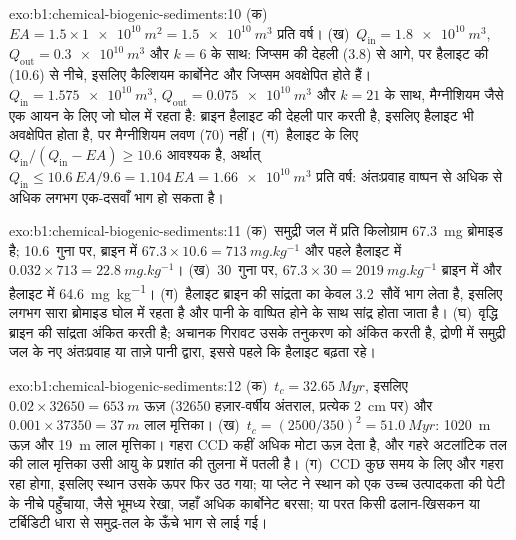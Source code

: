 \begin{solution}{exo:b1:chemical-biogenic-sediments:10}
(क)~$EA = 1.5\times\qty{1e10}{m^2} = \qty{1.5e10}{m^3}$ प्रति वर्ष। (ख)~$Q_{\mathrm{in}} = \qty{1.8e10}{m^3}$, $Q_{\mathrm{out}} = \qty{0.3e10}{m^3}$ और $k = 6$ के साथ: जिप्सम की देहली (3.8) से आगे, पर हैलाइट की (10.6) से नीचे, इसलिए कैल्शियम कार्बोनेट और जिप्सम अवक्षेपित होते हैं। $Q_{\mathrm{in}} =
\qty{1.575e10}{m^3}$, $Q_{\mathrm{out}} = \qty{0.075e10}{m^3}$ और $k = 21$ के साथ, मैग्नीशियम जैसे एक आयन के लिए जो घोल में रहता है: ब्राइन हैलाइट की देहली पार करती है, इसलिए हैलाइट भी अवक्षेपित होता है, पर मैग्नीशियम लवण (70) नहीं। (ग)~हैलाइट के लिए $Q_{\mathrm{in}}/(Q_{\mathrm{in}} - EA) \ge 10.6$ आवश्यक है, अर्थात् $Q_{\mathrm{in}} \le 10.6\,EA/9.6 = 1.104\,EA = \qty{1.66e10}{m^3}$ प्रति वर्ष: अंतःप्रवाह वाष्पन से अधिक से अधिक लगभग एक-दसवाँ भाग हो सकता है।
\end{solution}

\begin{solution}{exo:b1:chemical-biogenic-sediments:11}
(क)~समुद्री जल में प्रति किलोग्राम \qty{67.3}{mg} ब्रोमाइड है; 10.6~गुना पर, ब्राइन में $67.3\times10.6 = \qty{713}{mg.kg^{-1}}$ और पहले हैलाइट में $0.032\times713 = \qty{22.8}{mg.kg^{-1}}$। (ख)~30~गुना पर, $67.3\times30 =
\qty{2019}{mg.kg^{-1}}$ ब्राइन में और हैलाइट में \qty{64.6}{mg.kg^{-1}}। (ग)~हैलाइट ब्राइन की सांद्रता का केवल 3.2~सौवें भाग लेता है, इसलिए लगभग सारा ब्रोमाइड घोल में रहता है और पानी के वाष्पित होने के साथ सांद्र होता जाता है। (घ)~वृद्धि ब्राइन की सांद्रता अंकित करती है; अचानक गिरावट उसके तनुकरण को अंकित करती है, द्रोणी में समुद्री जल के नए अंतःप्रवाह या ताज़े पानी द्वारा, इससे पहले कि हैलाइट बढ़ता रहे।
\end{solution}

\begin{solution}{exo:b1:chemical-biogenic-sediments:12}
(क)~$t_c = \qty{32.65}{Myr}$, इसलिए $0.02\times\num{32650} = \qty{653}{m}$ ऊज़ (\num{32650} हज़ार-वर्षीय अंतराल, प्रत्येक \qty{2}{cm} पर) और $0.001\times\num{37350} = \qty{37}{m}$ लाल मृत्तिका। (ख)~$t_c = (2500/350)^2 =
\qty{51.0}{Myr}$: \qty{1020}{m} ऊज़ और \qty{19}{m} लाल मृत्तिका। गहरा CCD कहीं अधिक मोटा ऊज़ देता है, और गहरे अटलांटिक तल की लाल मृत्तिका उसी आयु के प्रशांत की तुलना में पतली है। (ग)~CCD कुछ समय के लिए और गहरा रहा होगा, इसलिए स्थान उसके ऊपर फिर उठ गया; या प्लेट ने स्थान को एक उच्च उत्पादकता की पेटी के नीचे पहुँचाया, जैसे भूमध्य रेखा, जहाँ अधिक कार्बोनेट बरसा; या परत किसी ढलान-खिसकन या टर्बिडिटी धारा से समुद्र-तल के ऊँचे भाग से लाई गई।
\end{solution}

